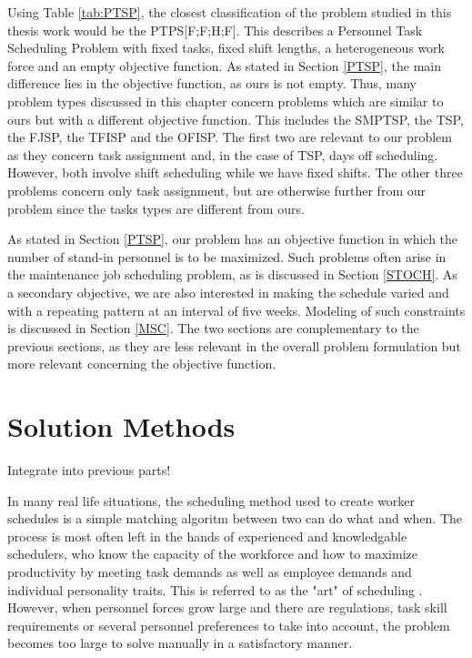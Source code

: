 Using Table \ref{tab:PTSP}, the closest classification of the problem studied in this thesis work would be the PTPS[F;F;H;F]. This describes a Personnel Task Scheduling Problem with fixed tasks, fixed shift lengths, a heterogeneous work force and an empty objective function. As stated in Section \ref{PTSP}, the main difference lies in the objective function, as ours is not empty. Thus, many problem types discussed in this chapter concern problems which are similar to ours but with a different objective function. This includes the SMPTSP, the TSP, the FJSP, the TFISP and the OFISP. The first two are relevant to our problem as they concern task assignment and, in the case of TSP, days off scheduling. However, both involve shift scheduling while we have fixed shifts. The other three problems concern only task assignment, but are otherwise further from our problem since the tasks types are different from ours.

As stated in Section \ref{PTSP}, our problem has an objective function in which the number of stand-in personnel is to be maximized. Such problems often arise in the maintenance job scheduling problem, as is discussed in Section \ref{STOCH}. As a secondary objective, we are also interested in making the schedule varied and with a repeating pattern at an interval of five weeks. Modeling of such constraints is discussed in Section \ref{MSC}. The two sections are complementary to the previous sections, as they are less relevant in the overall problem formulation but more relevant concerning the objective function.











\iffalse


\section{Solution Methods}
Integrate into previous parts!


In many real life situations, the scheduling method used to create worker schedules is a simple matching algoritm between two can do what and when. The process is most often left in the hands of experienced and knowledgable schedulers, who know the capacity of the workforce and how to maximize productivity by meeting task demands as well as employee demands and individual personality traits. This is referred to as the "art" of scheduling \citet{roberts_1983}. However, when personnel forces grow large and there are regulations, task skill requirements or several personnel preferences to take into account, the problem becomes too large to solve manually in a satisfactory manner.

